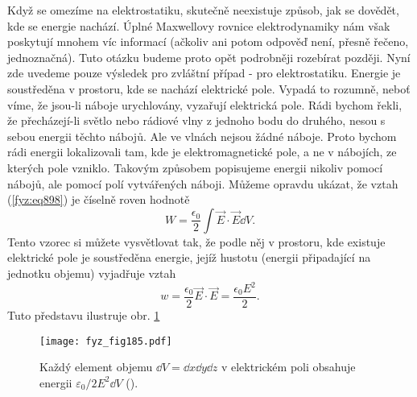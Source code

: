     Když se omezíme na elektrostatiku, skutečně neexistuje způsob, jak se dovědět, kde se energie
    nachází. Úplné Maxwellovy rovnice elektrodynamiky nám však poskytují mnohem víc informací
    (ačkoliv ani potom odpověď není, přesně řečeno, jednoznačná). Tuto otázku budeme proto opět
    podrobněji rozebírat později. Nyní zde uvedeme pouze výsledek pro zvláštní případ - pro
    elektrostatiku. Energie je soustředěna v prostoru, kde se nachází elektrické pole. Vypadá to
    rozumně, neboť víme, že jsou-li náboje urychlovány, vyzařují elektrická pole. Rádi bychom řekli,
    že přecházejí-li světlo nebo rádiové vlny z jednoho bodu do druhého, nesou s sebou energii
    těchto nábojů. Ale ve vlnách nejsou žádné náboje. Proto bychom rádi energii lokalizovali tam,
    kde je elektromagnetické pole, a ne v nábojích, ze kterých pole vzniklo. Takovým způsobem
    popisujeme energii nikoliv pomocí nábojů, ale pomocí polí vytvářených náboji. Můžeme opravdu
    ukázat, že vztah (\ref{fyz:eq898}) je číselně roven hodnotě
    \begin{equation}\label{fyz:eq900}
      W=\dfrac{ϵ_0}{2}\int\vec{E}\cdot\vec{E}\dd{V}.
    \end{equation}
    Tento vzorec si můžete vysvětlovat tak, že podle něj v prostoru, kde existuje elektrické pole je
    soustředěna energie, jejíž hustotu (energii připadající na jednotku objemu) vyjadřuje vztah
    \begin{equation}\label{fyz:eq901}
      w=\dfrac{ϵ_0}{2}\vec{E}\cdot\vec{E}=\dfrac{ϵ_0E^2}{2}.
    \end{equation}
    Tuto představu ilustruje obr. \ref{fyz:fig185}

    \begin{figure}[ht!]  %
      \centering
      \texttt{[image: fyz\_fig185.pdf]}
      \caption{Každý element objemu \(\dd{V} = \dd{x}\dd{y}\dd{z}\) v elektrickém  poli obsahuje
      energii \(\varepsilon_0/2E^2\dd{V}\) (\cite[s.~154]{Feynman02}).}
      \label{fyz:fig185}
    \end{figure}

